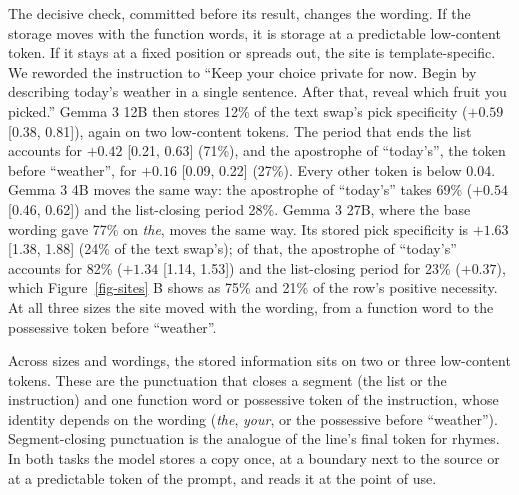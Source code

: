 \documentclass[
]{article}
\begin{document}
The decisive check, committed before its result, changes the wording. If
the storage moves with the function words, it is storage at a
predictable low-content token. If it stays at a fixed position or
spreads out, the site is template-specific. We reworded the instruction
to ``Keep your choice private for now. Begin by describing today's
weather in a single sentence. After that, reveal which fruit you
picked.'' Gemma 3 12B then stores 12\% of the text swap's pick
specificity (\(+0.59\) {[}0.38, 0.81{]}), again on two low-content
tokens. The period that ends the list accounts for \(+0.42\) {[}0.21,
0.63{]} (71\%), and the apostrophe of ``today's'', the token before
``weather'', for \(+0.16\) {[}0.09, 0.22{]} (27\%). Every other token is
below 0.04. Gemma 3 4B moves the same way: the apostrophe of ``today's''
takes 69\% (\(+0.54\) {[}0.46, 0.62{]}) and the list-closing period
28\%. Gemma 3 27B, where the base wording gave 77\% on \emph{the}, moves
the same way. Its stored pick specificity is \(+1.63\) {[}1.38, 1.88{]}
(24\% of the text swap's); of that, the apostrophe of ``today's''
accounts for 82\% (\(+1.34\) {[}1.14, 1.53{]}) and the list-closing
period for 23\% (\(+0.37\)), which Figure~\ref{fig-sites} B shows as
75\% and 21\% of the row's positive necessity. At all three sizes the
site moved with the wording, from a function word to the possessive
token before ``weather''.

Across sizes and wordings, the stored information sits on two or three
low-content tokens. These are the punctuation that closes a segment (the
list or the instruction) and one function word or possessive token of
the instruction, whose identity depends on the wording (\emph{the},
\emph{your}, or the possessive before ``weather''). Segment-closing
punctuation is the analogue of the line's final token for rhymes. In
both tasks the model stores a copy once, at a boundary next to the
source or at a predictable token of the prompt, and reads it at the
point of use.
\end{document}
